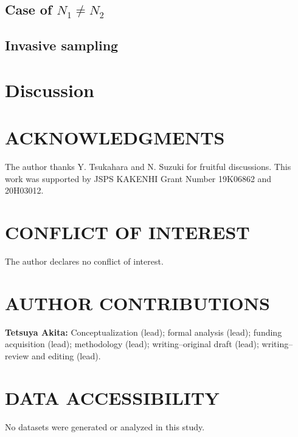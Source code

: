 \documentclass[12pt, English]{article}
\begin{document}
\begin{spacing}{1.9}
\subsection{Case of $N_1 \neq N_2$}

\subsection{Invasive sampling}






\section{Discussion}\label{sec4}


\section*{ACKNOWLEDGMENTS}
The author thanks Y. Tsukahara and N. Suzuki for fruitful discussions. This work was supported by JSPS KAKENHI Grant Number 19K06862 and 20H03012.

\section*{CONFLICT OF INTEREST}
The author declares no conflict of interest.

\section*{AUTHOR CONTRIBUTIONS}
{\bf Tetsuya Akita:} Conceptualization (lead); formal analysis (lead); funding acquisition (lead); methodology (lead); writing--original draft (lead); writing--review and editing (lead).

\section*{DATA ACCESSIBILITY}
No datasets were generated or analyzed in this study.




\clearpage


\end{spacing}
\end{document}
